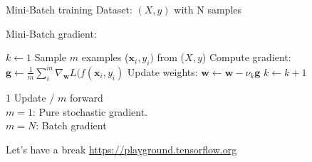 \documentclass[handout]{beamer}
\begin{document}
\begin{frame}{Mini-Batch training}
Dataset: $(X,y)$ with N samples
\begin{footnotesize}
\begin{block}{Mini-Batch gradient:}\end{block}

    \begin{algorithmic}
    \State $k \leftarrow 1$
    \State Sample $m$ examples ($\mathbf{x}_i,y_i)$ from ($X,y$)
    \State Compute gradient: $\mathbf{g} \leftarrow \frac{1}{m}\sum_i^m\nabla_\mathbf{w}L(f(\mathbf{x}_i,y_i)$
    \State Update weights: $\mathbf{w} \leftarrow \mathbf{w} - \nu_k\mathbf{g}$
    \State $k \leftarrow k + 1$
    \EndWhile 
    
    \end{algorithmic}
    \end{footnotesize}
    \pause
        \alert{1 Update / $m$ forward}\\
        $m=1$: Pure stochastic gradient.\\
        $m=N$: Batch gradient

\end{frame}


\begin{frame}{Let's have a break}
\url{https://playground.tensorflow.org}
\end{frame}
\end{document}
